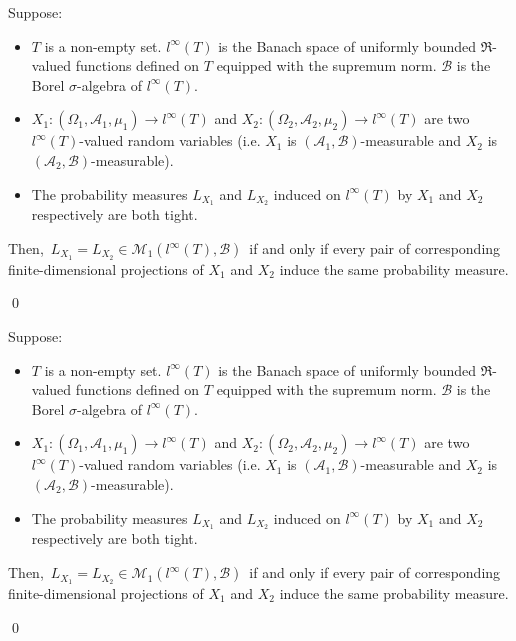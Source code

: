 \begin{lemma}
\label{FiniteDimensionalProjectionsDetermineTightLaws}
\mbox{}\vskip 0.1cm
\noindent
Suppose:
\begin{itemize}
\item
	$T$ is a non-empty set.
	$l^{\infty}(T)$ is the Banach space of uniformly bounded $\Re$-valued functions defined on $T$
	equipped with the supremum norm.
	$\mathcal{B}$ is the Borel $\sigma$-algebra of $l^{\infty}(T)$.
\item
	$X_{1} : (\Omega_{1},\mathcal{A}_{1},\mu_{1}) \longrightarrow l^{\infty}(T)$
	and
	$X_{2} : (\Omega_{2},\mathcal{A}_{2},\mu_{2}) \longrightarrow l^{\infty}(T)$
	are two $l^{\infty}(T)$-valued random variables
	(i.e. $X_{1}$ is $(\mathcal{A}_{1},\mathcal{B})$-measurable and
	$X_{2}$ is $(\mathcal{A}_{2},\mathcal{B})$-measurable).
\item
	The probability measures $L_{X_{1}}$ and $L_{X_{2}}$ induced on $l^{\infty}(T)$
	by $X_{1}$ and $X_{2}$ respectively are both tight.
\end{itemize}
Then,
\,$L_{X_{1}} = L_{X_{2}} \in \mathcal{M}_{1}(l^{\infty}(T),\mathcal{B})$\,
if and only if
every pair of corresponding finite-dimensional projections of $X_{1}$ and $X_{2}$
induce the same probability measure.
\end{lemma}
\proof
\qed


\begin{theorem}
\mbox{}\vskip 0.1cm
\noindent
Suppose:
\begin{itemize}
\item
	$T$ is a non-empty set.
	$l^{\infty}(T)$ is the Banach space of uniformly bounded $\Re$-valued functions defined on $T$
	equipped with the supremum norm.
	$\mathcal{B}$ is the Borel $\sigma$-algebra of $l^{\infty}(T)$.
\item
	$X_{1} : (\Omega_{1},\mathcal{A}_{1},\mu_{1}) \longrightarrow l^{\infty}(T)$
	and
	$X_{2} : (\Omega_{2},\mathcal{A}_{2},\mu_{2}) \longrightarrow l^{\infty}(T)$
	are two $l^{\infty}(T)$-valued random variables
	(i.e. $X_{1}$ is $(\mathcal{A}_{1},\mathcal{B})$-measurable and
	$X_{2}$ is $(\mathcal{A}_{2},\mathcal{B})$-measurable).
\item
	The probability measures $L_{X_{1}}$ and $L_{X_{2}}$ induced on $l^{\infty}(T)$
	by $X_{1}$ and $X_{2}$ respectively are both tight.
\end{itemize}
Then,
\,$L_{X_{1}} = L_{X_{2}} \in \mathcal{M}_{1}(l^{\infty}(T),\mathcal{B})$\,
if and only if
every pair of corresponding finite-dimensional projections of $X_{1}$ and $X_{2}$
induce the same probability measure.
\end{theorem}
\proof
\qed


\renewcommand{\theenumi}{\roman{enumi}}
\renewcommand{\labelenumi}{\textnormal{(\theenumi)}$\;\;$}

